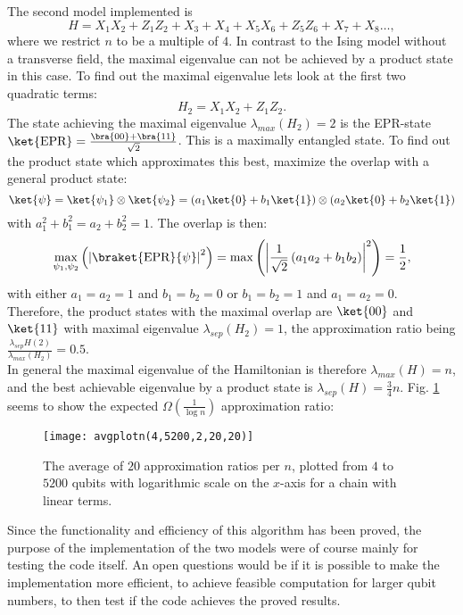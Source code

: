 \noindent The second model implemented is \[
	H =  X_1X_{2}+Z_1Z_{2}+X_{3}+X_{4}+X_5X_{6}+Z_5Z_{6}+X_{7}+X_{8}\ldots
,\]
where we restrict $n$ to be a multiple of $4$.
In contrast to the Ising model without a transverse field, the maximal eigenvalue can not be achieved by a product state in this case.
To find out the maximal eigenvalue lets look at the first two quadratic terms:
\[
H_2=X_1X_2+Z_1Z_2
.\]
The state achieving the maximal eigenvalue $\lambda_{max}(H_2)=2$ is the EPR-state $\ket{\text{EPR}}=\frac{\bra{00}+\bra{11}}{\sqrt{2}}$.
This is a maximally entangled state.
To find out the product state which approximates this best, maximize the overlap with a general product state:
\[
	\ket{\psi}=\ket{\psi_1}\otimes\ket{\psi_2}=\left(a_1\ket{0}+b_1\ket{1}\right)\otimes\left(a_2\ket{0}+b_2\ket{1}\right)
\] with $a_1^2+b_1^2=a_2+b_2^2=1$.
The overlap is then:\[
\max_{\psi_1,\psi_2}\left(\left|\braket{\text{EPR}}{\psi}\right|^2\right)=\max\left(\left|\frac{1}{\sqrt{2}}\left(a_1a_2+b_1b_2\right)\right|^2\right)=\frac{1}{2}
,\]
with either $a_1=a_2=1$ and $b_1=b_2=0$ or $b_1=b_2=1$ and $a_1=a_2=0$.
Therefore, the product states with the maximal overlap are $\ket{00}$ and $\ket{11}$ with maximal eigenvalue $\lambda_{sep}(H_2)=1$, the approximation ratio being  $\frac{\lambda_{sep}H(2)}{\lambda_{max}(H_2)} = 0.5$.\\
In general the maximal eigenvalue of the Hamiltonian is therefore $\lambda_{max}(H)=n$, and the best achievable eigenvalue by a product state is $\lambda_{sep}(H)=\frac{3}{4}n$.
Fig. \ref{fig:3} seems to show the expected $\Omega\left( \frac{1}{\log{}n} \right) $ approximation ratio:
\begin{figure}[H]
	\centering
	\texttt{[image: avgplotn(4,5200,2,20,20)]}
	\caption{The average of $20$ approximation ratios per $n$, plotted from $4$ to $5200$ qubits with logarithmic scale on the $x$-axis for a chain with linear terms.}
	\label{fig:3}
\end{figure}
\noindent Since the functionality and efficiency of this algorithm has been proved, the purpose of the implementation of the two models were of course mainly for testing the code itself.
An open questions would be if it is possible to make the implementation more efficient, to achieve feasible computation for larger qubit numbers, to then test if the code achieves the proved results.
